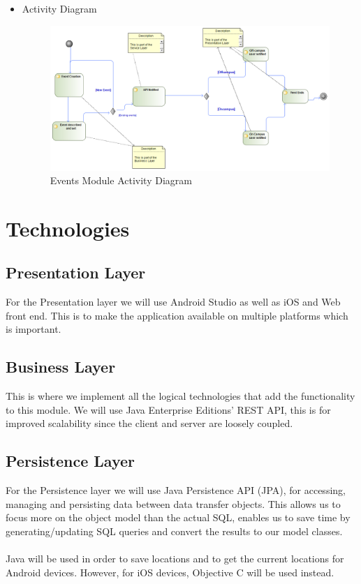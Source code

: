 \documentclass{article}
\begin{document}
\begin{itemize}
					\item Activity Diagram
					\begin{center}
						\begin{figure}[!h]
							\includegraphics[scale=0.4]{Events_Activity_Diagram.png}
							\caption{Events Module Activity Diagram}
						\end{figure}
					\end{center}
										
				\end{itemize}
				
		\section{Technologies}
		
		\subsection{Presentation Layer}
		For the Presentation layer we will use Android Studio as well as iOS and Web front end. This is to make the application available on multiple platforms which is important.
		
		\subsection{Business Layer}
		This is where we implement all the logical technologies that add the functionality to this module. We will use Java Enterprise Editions' REST API, this is for improved scalability since the client and server are loosely coupled.
		
		\subsection{Persistence Layer}
		For the Persistence layer we will use Java Persistence API (JPA), for accessing, managing and persisting data between data transfer objects. This allows us to focus more on the object model than the actual SQL, enables us to save time by generating/updating SQL queries and convert the results to our model classes.\\\\
		Java will be used in order to save locations and to get the current locations for Android devices. However, for iOS devices, Objective C will be used instead.
		
\end{document}
